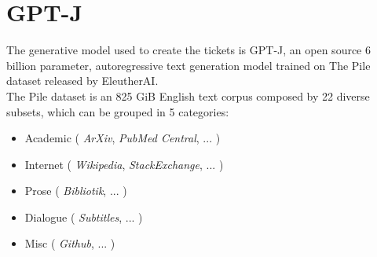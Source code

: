 \section{GPT-J}
The generative model used to create the tickets is GPT-J, an open source 6 billion parameter, autoregressive text generation model trained on The Pile dataset released by EleutherAI. \\
The Pile dataset\cite{gao2020pile} is an 825 GiB English text corpus composed by 22 diverse subsets, which can be grouped in 5 categories:
\begin{itemize}
    \item Academic ( \textit{ArXiv}, \textit{PubMed Central}, ... )
    \item Internet ( \textit{Wikipedia}, \textit{StackExchange}, ... )
    \item Prose ( \textit{Bibliotik}, ... )
    \item Dialogue ( \textit{Subtitles}, ... )
    \item Misc ( \textit{Github}, ... )
\end{itemize}
